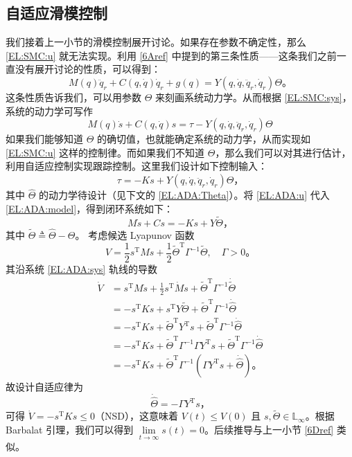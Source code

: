 \subsection{自适应滑模控制}\label{6Eref}

我们接着上一小节的滑模控制展开讨论。如果存在参数不确定性，那么 \eqref{EL:SMC:u} 就无法实现。利用 \ref{6Aref} 中提到的第三条性质——这条我们之前一直没有展开讨论的性质，可以得到：
\[
    M (q) \ddot{q}_r + C (q, \dot{q}) \dot{q}_r +g(q)= Y (q, \dot{q}, \ddot{q}_r, \dot{q}_r) \Theta \text{。}
\]
这条性质告诉我们，可以用参数 $\Theta$ 来刻画系统动力学。从而根据 \eqref{EL:SMC:sys}，系统的动力学可写作
\begin{equation} \label{EL:ADA:model}
    M(q) \dot{s} + C(q, \dot{q}) s = \tau - Y (q, \dot{q}, \ddot{q}_r, \dot{q}_r) \Theta
\end{equation}
如果我们能够知道 $\Theta$ 的确切值，也就能确定系统的动力学，从而实现如 \eqref{EL:SMC:u} 这样的控制律。而如果我们不知道 $\Theta$，那么我们可以对其进行估计，利用自适应控制实现跟踪控制。这里我们设计如下控制输入：
\begin{equation} \label{EL:ADA:u}
    \tau = - K s + Y (q, \dot{q}, \ddot{q}_r, \dot{q}_r) \hat{\Theta} \text{，}
\end{equation}
其中 $\hat{\Theta}$ 的动力学待设计（见下文的 \eqref{EL:ADA:Theta}）。将 \eqref{EL:ADA:u} 代入 \eqref{EL:ADA:model}，得到闭环系统如下：
\begin{equation} \label{EL:ADA:sys}
    M \dot{s} + C s = - K s + Y \tilde{\Theta} \text{，}
\end{equation}
其中 $\tilde{\Theta} \triangleq \hat{\Theta} - \Theta$。
考虑候选 Lyapunov 函数
\[
    V = \frac{1}{2} s^\mathrm{T} M  s + \frac{1}{2} \tilde{\Theta}^\mathrm{T} \Gamma^{-1} \tilde{\Theta}, \quad \Gamma > 0 \text{。}
\]
其沿系统 \eqref{EL:ADA:sys} 轨线的导数
\begin{align*}
    \dot{V} & = s^\mathrm{T} M \dot{s} + \frac{1}{2} s^\mathrm{T} \dot{M} s + \tilde{\Theta}^\mathrm{T} \Gamma^{-1} \dot{\tilde{\Theta}} \\
    & = - s^\mathrm{T} K  s + s^\mathrm{T} Y \tilde{\Theta} + \tilde{\Theta}^\mathrm{T} \Gamma^{- 1} \dot{\hat{\Theta}}\\
    & = - s^\mathrm{T} K  s + \tilde{\Theta}^\mathrm{T}   Y^\mathrm{T} s + \tilde{\Theta}^\mathrm{T} \Gamma^{- 1} \dot{\hat{\Theta}}\\
    & = - s^\mathrm{T} K  s + \tilde{\Theta}^\mathrm{T} \Gamma^{- 1} \Gamma  Y^\mathrm{T} s + \tilde{\Theta}^\mathrm{T} \Gamma^{- 1} \dot{\hat{\Theta}}\\
    & = - s^\mathrm{T} K  s + \tilde{\Theta}^\mathrm{T} \Gamma^{- 1} (\Gamma  Y^\mathrm{T} s + \dot{\hat{\Theta}} ) \text{。}
\end{align*}
故设计自适应律为
\begin{equation} \label{EL:ADA:Theta}
    \dot{\hat{\Theta}} = - \Gamma Y^\mathrm{T} s \text{，}
\end{equation}
可得 $\dot{V} = - s^\mathrm{T} K s \leq 0$（NSD），这意味着 $V (t) \leq V (0)$ 且 $s, \tilde{\Theta} \in \mathbb{L}_{\infty}$。根据 Barbalat 引理，我们可以得到 $\lim\limits_{t \rightarrow \infty} s (t) = 0$。后续推导与上一小节 \ref{6Dref} 类似。

